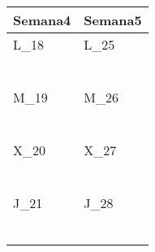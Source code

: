 	\renewcommand{\arraystretch}{1.25}\scriptsize
	\begin{longtabu} to \textwidth { X[l] X[l]}
		\centering \textbf{Semana4} &  \centering\textbf{Semana5}  \\
		\toprule
		L_{18} & L_{25} \\
		\makebox{$\square$}\dotfill & \makebox{$\square$}\dotfill \\
		\dotfill & \dotfill \\
		\makebox{$\square$}\dotfill & \makebox{$\square$}\dotfill \\
		\dotfill & \dotfill \\
		\makebox{$\square$}\dotfill & \makebox{$\square$}\dotfill \\
		\dotfill & \dotfill \\

		\hline

		M_{19} & M_{26} \\
		\makebox{$\square$}\dotfill & \makebox{$\square$}\dotfill \\
		\dotfill & \dotfill \\
		\makebox{$\square$}\dotfill & \makebox{$\square$}\dotfill \\
		\dotfill & \dotfill \\
		\makebox{$\square$}\dotfill & \makebox{$\square$}\dotfill \\
		\dotfill & \dotfill \\

		\hline

		X_{20} & X_{27} \\
		\makebox{$\square$}\dotfill & \makebox{$\square$}\dotfill \\
		\dotfill & \dotfill \\
		\makebox{$\square$}\dotfill & \makebox{$\square$}\dotfill \\
		\dotfill & \dotfill \\
		\makebox{$\square$}\dotfill & \makebox{$\square$}\dotfill \\
		\dotfill & \dotfill \\

		\hline

		J_{21} & J_{28} \\
		\makebox{$\square$}\dotfill & \makebox{$\square$}\dotfill \\
		\dotfill & \dotfill \\
		\makebox{$\square$}\dotfill & \makebox{$\square$}\dotfill \\
		\dotfill & \dotfill \\
		\makebox{$\square$}\dotfill & \makebox{$\square$}\dotfill \\
		\dotfill & \dotfill \\


\end{longtabu}
